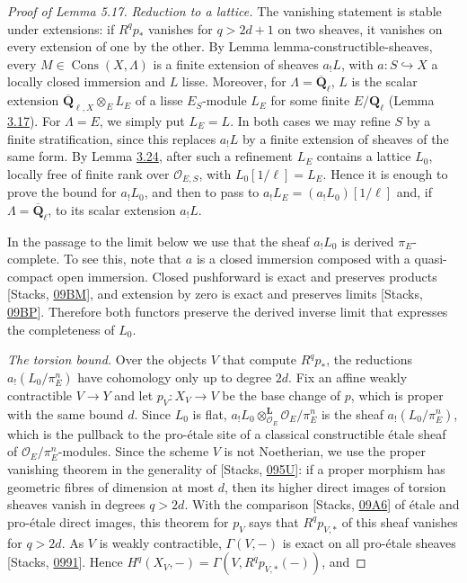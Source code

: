 \documentclass[11pt]{article}
\providecommand{\Cons}{}\renewcommand{\Cons}{\operatorname{Cons}}
\providecommand{\QbarX}{}\renewcommand{\QbarX}{\overline{\mathbf Q}_{\ell,X}}
\begin{document}
\begin{proof}[{Proof of Lemma 5.17}]\label{bp465}%
\emph{Reduction to a lattice.} The vanishing statement is stable under extensions: if \(R^qp_*\) vanishes for \(q>2d+1\) on two sheaves, it vanishes on every extension of one by the other. By Lemma lemma-constructible-sheaves, every \(M\in\Cons(X,\Lambda)\) is a finite extension of sheaves \(a_!L\), with \(a:S\hookrightarrow X\) a locally closed immersion and \(L\) lisse. Moreover, for \(\Lambda=\overline{\mathbf Q}_\ell\), \(L\) is the scalar extension \(\QbarX\otimes_{E}L_E\) of a lisse \(E_S\)-module \(L_E\) for some finite \(E/\mathbf Q_\ell\) (Lemma \hyperref[bp245]{3.17}). For \(\Lambda=E\), we simply put \(L_E=L\). In both cases we may refine \(S\) by a finite stratification, since this replaces \(a_!L\) by a finite extension of sheaves of the same form. By Lemma \hyperref[bp269]{3.24}, after such a refinement \(L_E\) contains a lattice \(L_0\), locally free of finite rank over \(\mathcal O_{E,S}\), with \(L_0[1/\ell]=L_E\). Hence it is enough to prove the bound for \(a_!L_0\), and then to pass to \(a_!L_E=(a_!L_0)[1/\ell]\) and, if \(\Lambda=\overline{\mathbf Q}_\ell\), to its scalar extension \(a_!L\).

In the passage to the limit below we use that the sheaf \(a_!L_0\) is derived \(\pi_E\)-complete. To see this, note that \(a\) is a closed immersion composed with a quasi-compact open immersion. Closed pushforward is exact and preserves products [Stacks, \href{https://stacks.math.columbia.edu/tag/09BM}{09BM}], and extension by zero is exact and preserves limits [Stacks, \href{https://stacks.math.columbia.edu/tag/09BP}{09BP}]. Therefore both functors preserve the derived inverse limit that expresses the completeness of \(L_0\).

\emph{The torsion bound.} Over the objects \(V\) that compute \(R^qp_*\), the reductions \(a_!(L_0/\pi_E^n)\) have cohomology only up to degree \(2d\). Fix an affine weakly contractible \(V\to Y\) and let \(p_V:X_V\to V\) be the base change of \(p\), which is proper with the same bound \(d\). Since \(L_0\) is flat, \(a_!L_0\otimes^{\mathbf L}_{\mathcal O_E}
\mathcal O_E/\pi_E^n\) is the sheaf \(a_!(L_0/\pi_E^n)\), which is the pullback to the pro-étale site of a classical constructible étale sheaf of \(\mathcal O_E/\pi_E^n\)-modules. Since the scheme \(V\) is not Noetherian, we use the proper vanishing theorem in the generality of [Stacks, \href{https://stacks.math.columbia.edu/tag/095U}{095U}]: if a proper morphism has geometric fibres of dimension at most \(d\), then its higher direct images of torsion sheaves vanish in degrees \(q>2d\). With the comparison [Stacks, \href{https://stacks.math.columbia.edu/tag/09A6}{09A6}] of étale and pro-étale direct images, this theorem for \(p_V\) says that \(R^qp_{V,*}\) of this sheaf vanishes for \(q>2d\). As \(V\) is weakly contractible, \(\Gamma(V,-)\) is exact on all pro-étale sheaves [Stacks, \href{https://stacks.math.columbia.edu/tag/0991}{0991}]. Hence \(H^q(X_V,-)=\Gamma(V,R^qp_{V,*}(-))\), and


\end{proof}
\end{document}
